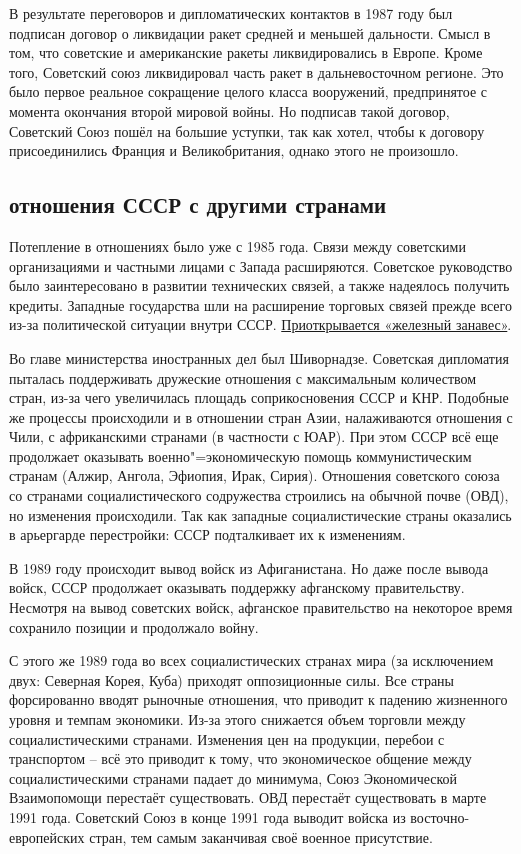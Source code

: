 В результате переговоров и дипломатических контактов в 1987 году был подписан договор о ликвидации ракет средней и меньшей дальности. Смысл в том, что советские и американские ракеты ликвидировались в Европе. Кроме того, Советский союз ликвидировал часть ракет в дальневосточном регионе. Это было первое реальное сокращение целого класса вооружений, предпринятое с момента окончания второй мировой войны. Но подписав такой договор, Советский Союз пошёл на большие уступки, так как хотел, чтобы к договору присоединились Франция и Великобритания, однако этого не произошло.

\subsection{отношения СССР с другими странами}
Потепление в отношениях было уже с 1985 года. Связи между советскими организациями и частными лицами с Запада расширяются. Советское руководство было заинтересовано в развитии технических связей, а также надеялось получить кредиты. Западные государства шли на расширение торговых связей прежде всего из-за политической ситуации внутри СССР. \underline{Приоткрывается «железный занавес»}. 

Во главе министерства иностранных дел был Шиворнадзе. Советская дипломатия пыталась поддерживать дружеские отношения с максимальным количеством стран, из-за чего увеличилась площадь соприкосновения СССР и КНР. Подобные же процессы происходили и в отношении стран Азии, налаживаются отношения с Чили, с африканскими странами (в частности с ЮАР). При этом СССР всё еще продолжает оказывать военно"=экономическую помощь коммунистическим странам (Алжир, Ангола, Эфиопия, Ирак, Сирия). Отношения советского союза со странами социалистического содружества строились на обычной почве (ОВД), но изменения происходили. Так как западные социалистические страны оказались в арьергарде перестройки: СССР подталкивает их к изменениям.

В 1989 году происходит вывод войск из Афиганистана. Но даже после вывода войск, СССР продолжает оказывать поддержку афганскому правительству. Несмотря на вывод советских войск, афганское правительство на некоторое время сохранило позиции и продолжало войну.

С этого же 1989 года во всех социалистических странах мира (за исключением двух: Северная Корея, Куба) приходят оппозиционные силы. Все страны форсированно вводят рыночные отношения, что приводит к падению жизненного уровня и темпам экономики. Из-за этого снижается объем торговли между социалистическими странами. Изменения цен на продукции, перебои с транспортом – всё это приводит к тому, что экономическое общение между социалистическими странами падает до минимума, Союз Экономической Взаимопомощи перестаёт существовать. ОВД перестаёт существовать в марте 1991 года. Советский Союз в конце 1991 года выводит войска из восточно-европейских стран, тем самым заканчивая своё военное присутствие. 

